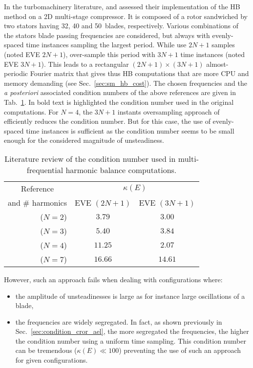 In the turbomachinery literature, \citet{Gopinath2007} and
\citet{Ekici2007} assessed their implementation of the
HB method on a 2D multi-stage compressor. 
It is composed of a rotor sandwiched by two stators having
32, 40 and 50~blades, respectively. Various combinations of the stators
blade passing frequencies are considered, 
but always with evenly-spaced time instances sampling the
largest period.  While \citet{Gopinath2007} use $2N+1$ samples (noted EVE $2N+1$),
\citet{Ekici2007} over-sample this period with $3N+1$ time instances
(noted EVE $3N+1$). This
leads to a rectangular $(2N+1)\times(3N+1)$ almost-periodic Fourier
matrix that gives thus HB computations that are more CPU and memory demanding
(see Sec.~\ref{sec:sm_hb_cost}). 
The chosen frequencies and the \emph{a posteriori}
associated condition numbers of the above references are given in
Tab.~\ref{tab:literature_multistage}.  
In bold text is highlighted the condition number used in the
original computations.
For $N=4$, the $3N+1$ instants
oversampling approach of \citet{Ekici2007} efficiently reduces the
condition number. But for this case, the use of evenly-spaced time
instances is sufficient as the condition number seems to be small enough
for the considered magnitude of unsteadiness.
\begin{table}[htp]
   \centering
  \begin{tabular}{rcc}
    \toprule
    \multicolumn{1}{c}{Reference} & \multicolumn{2}{c}{$\kappa(E)$} \\
    \multicolumn{1}{c}{and \# harmonics} & EVE $(2N+1)$ & EVE $(3N+1)$ \\
    \midrule
    \citet{Gopinath2007} ($N=2$) & $\mathbf{3.79}$ & $3.00$ \\
    \citet{Ekici2007} ($N=3$) & $5.40$ & $\mathbf{3.84}$ \\
    \citet{Gopinath2007} ($N=4$) & $\mathbf{11.25}$ & $2.07$ \\
    \citet{Gopinath2007} ($N=7$) & $\mathbf{16.66}$ & $14.61$ \\
    \bottomrule
  \end{tabular}
  \caption{Literature review of the condition number used in multi-frequential
  harmonic balance computations.}
  \label{tab:literature_multistage}
\end{table}

However, such an approach fails when dealing with configurations where:
\begin{itemize} \itemsep0pt \parskip0pt
  \item the amplitude of unsteadinesses is large as for instance
  large oscillations of a blade,
  \item the frequencies are widely segregated. In fact, as shown previously
  in Sec.~\ref{sec:condition_cror_ael}, the more segregated the frequencies, the
  higher the condition number using a uniform time sampling. This condition number
  can be tremendous ($\kappa (E) \ll 100$) preventing the use of such
  an approach for given configurations.
\end{itemize}

